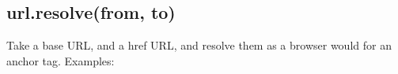 \subsection{url.resolve(from, to)}\label{url.resolvefrom-to}

Take a base URL, and a href URL, and resolve them as a browser would for
an anchor tag. Examples:

\begin{Shaded}
\begin{Highlighting}[]
\NormalTok{(}\NormalTok{, }\NormalTok{)         }
\NormalTok{(}\NormalTok{, }\NormalTok{)    }
\NormalTok{(}\NormalTok{, }\NormalTok{) }
\end{Highlighting}
\end{Shaded}

